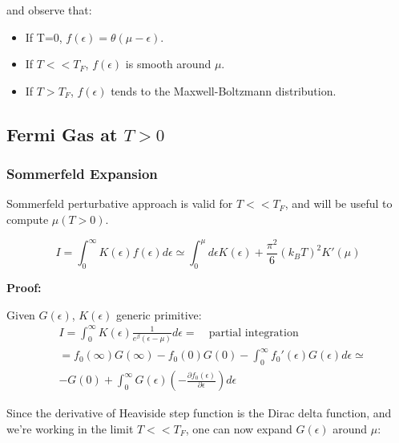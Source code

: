 \documentclass{article}
\begin{document}
and observe that:

\begin{itemize}
    \item If T=0, $f(\epsilon)=\theta(\mu-\epsilon)$.
    \item If $T<<T_F$, $f(\epsilon)$ is smooth around $\mu$.
    \item If $T>T_F$, $f(\epsilon)$ tends to the Maxwell-Boltzmann distribution.
\end{itemize}

\subsection{Fermi Gas at $T>0$}
\subsubsection{Sommerfeld Expansion}

Sommerfeld perturbative approach is valid for $T<<T_F$, and will be useful to compute $\mu(T>0)$.

\begin{tcolorbox}[colframe=gray!50, colback=gray!10, coltitle=black, title=Sommerfeld expansion]

    \begin{equation}
        I=\int_{0}^{\infty}K(\epsilon)f(\epsilon)d\epsilon \simeq \int_0^\mu d\epsilon K(\epsilon)+\frac{\pi^2}{6}(k_BT)^2K'(\mu)
    \end{equation}

\end{tcolorbox}

\textbf{Proof:}

Given $G(\epsilon)$, $K(\epsilon)$ generic primitive:
\begin{equation}
    \begin{aligned}
         & I=\int_0^\infty K(\epsilon)\frac{1}{e^\beta(\epsilon-\mu)}d\epsilon= \quad \text{partial integration}   \\
         & =f_0(\infty)G(\infty)-f_0(0)G(0)-\int_0^\infty f_0'(\epsilon)G(\epsilon)d\epsilon\simeq                 \\
         & -G(0)+\int_0^\infty G(\epsilon)\left(-\frac{\partial f_0(\epsilon)}{\partial \epsilon} \right)d\epsilon
    \end{aligned}
\end{equation}

Since the derivative of Heaviside step function is the Dirac delta function, and we're working in the limit $T<<T_F$,
one can now expand $G(\epsilon)$ around $\mu$:
\end{document}
